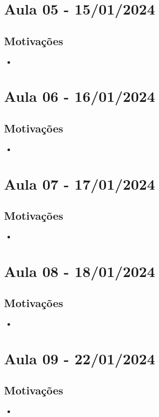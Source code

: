 \documentclass{article}
\begin{document}
\section{Aula 05 - 15/01/2024}
\subsection{Motivações}
\begin{itemize}
	\item
\end{itemize}
\newpage
\section{Aula 06 - 16/01/2024}
\subsection{Motivações}
\begin{itemize}
	\item
\end{itemize}
\newpage
\section{Aula 07 - 17/01/2024}
\subsection{Motivações}
\begin{itemize}
	\item
\end{itemize}
\newpage
\section{Aula 08 - 18/01/2024}
\subsection{Motivações}
\begin{itemize}
	\item
\end{itemize}
\newpage
\section{Aula 09 - 22/01/2024}
\subsection{Motivações}
\begin{itemize}
	\item
\end{itemize}
\newpage
\end{document}
